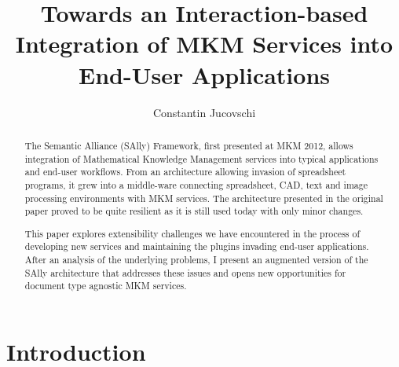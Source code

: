 \documentclass{llncs}
\author{Constantin Jucovschi}
\title{Towards an Interaction-based Integration of MKM Services into End-User Applications}
\institute{Jacobs University Bremen}
\begin{document}
\maketitle



\begin{abstract}
The Semantic Alliance (SAlly) Framework, first presented at MKM 2012, allows integration of Mathematical Knowledge Management services into typical applications and end-user workflows. From an architecture allowing invasion of spreadsheet programs, it grew into a middle-ware connecting spreadsheet, CAD, text and image processing environments with MKM services. The architecture presented in the original paper proved to be quite resilient as it is still used today with only minor changes.

This paper explores extensibility challenges we have encountered in the process of developing new services and maintaining the plugins invading end-user applications. After an analysis of the underlying problems, I present an augmented version of the SAlly architecture that addresses these issues and opens new opportunities for document type agnostic MKM services. 
\end{abstract}

\section{Introduction}
\end{document}
